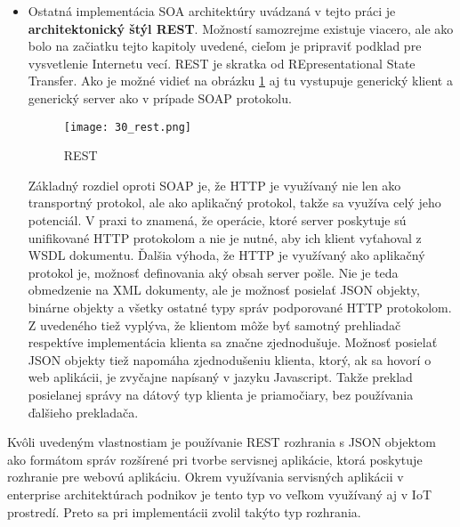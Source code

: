 \begin{itemize}
 \item Ostatná implementácia SOA architektúry uvádzaná v tejto práci je \textbf{architektonický štýl REST}. Možností samozrejme existuje viacero, ale ako bolo na začiatku tejto kapitoly uvedené, cieľom je pripraviť podklad pre vysvetlenie Internetu vecí. REST je skratka od REpresentational State Transfer. Ako je možné vidieť na obrázku \ref{30_rest} aj tu vystupuje generický klient a generický server ako v prípade SOAP protokolu.
\begin{figure}[h]
\centering
\texttt{[image: 30\_rest.png]}
\caption{REST \cite{IOT14}}
\label{30_rest}
\end{figure} 
Základný rozdiel oproti SOAP je, že HTTP je využívaný nie len ako transportný protokol, ale ako aplikačný protokol, takže sa využíva celý jeho potenciál. V praxi to znamená, že operácie, ktoré server poskytuje sú unifikované HTTP protokolom a nie je nutné, aby ich klient vyťahoval z WSDL dokumentu. Ďalšia výhoda, že HTTP je využívaný ako aplikačný protokol je, možnosť definovania aký obsah server pošle. Nie je teda obmedzenie na XML dokumenty, ale je možnosť posielať JSON objekty, binárne objekty a všetky ostatné typy správ podporované HTTP protokolom. Z uvedeného tiež vyplýva, že klientom môže byť samotný prehliadač respektíve implementácia klienta sa značne zjednodušuje. Možnosť posielať JSON objekty tiež napomáha zjednodušeniu klienta, ktorý, ak sa hovorí o web aplikácii, je zvyčajne napísaný v jazyku Javascript. Takže preklad posielanej správy na dátový typ klienta je priamočiary, bez používania ďalšieho prekladača. 
\end{itemize}
Kvôli uvedeným vlastnostiam je používanie REST rozhrania s JSON objektom ako formátom správ rozšírené pri tvorbe servisnej aplikácie, ktorá poskytuje rozhranie pre webovú aplikáciu. Okrem využívania servisných aplikácii v enterprise architektúrach podnikov je tento typ vo veľkom využívaný aj v IoT prostredí. Preto sa pri implementácii zvolil takýto typ rozhrania.

